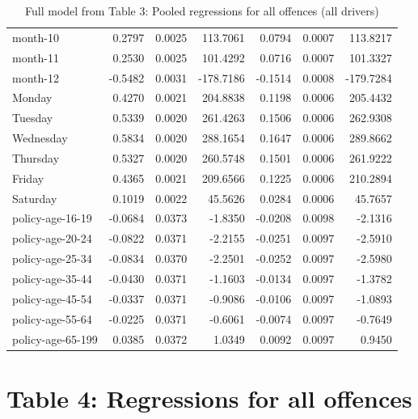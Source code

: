 \documentclass[10pt]{article}
\begin{document}
\begin{table}[ht]
\begin{tabular}{lrrrrrr}
  month-10 & 0.2797 & 0.0025 & 113.7061 & 0.0794 & 0.0007 & 113.8217 \\ 
  month-11 & 0.2530 & 0.0025 & 101.4292 & 0.0716 & 0.0007 & 101.3327 \\ 
  month-12 & -0.5482 & 0.0031 & -178.7186 & -0.1514 & 0.0008 & -179.7284 \\ 
  Monday & 0.4270 & 0.0021 & 204.8838 & 0.1198 & 0.0006 & 205.4432 \\ 
  Tuesday & 0.5339 & 0.0020 & 261.4263 & 0.1506 & 0.0006 & 262.9308 \\ 
  Wednesday & 0.5834 & 0.0020 & 288.1654 & 0.1647 & 0.0006 & 289.8662 \\ 
  Thursday & 0.5327 & 0.0020 & 260.5748 & 0.1501 & 0.0006 & 261.9222 \\ 
  Friday & 0.4365 & 0.0021 & 209.6566 & 0.1225 & 0.0006 & 210.2894 \\ 
  Saturday & 0.1019 & 0.0022 & 45.5626 & 0.0284 & 0.0006 & 45.7657 \\ 
  policy-age-16-19 & -0.0684 & 0.0373 & -1.8350 & -0.0208 & 0.0098 & -2.1316 \\ 
  policy-age-20-24 & -0.0822 & 0.0371 & -2.2155 & -0.0251 & 0.0097 & -2.5910 \\ 
  policy-age-25-34 & -0.0834 & 0.0370 & -2.2501 & -0.0252 & 0.0097 & -2.5980 \\ 
  policy-age-35-44 & -0.0430 & 0.0371 & -1.1603 & -0.0134 & 0.0097 & -1.3782 \\ 
  policy-age-45-54 & -0.0337 & 0.0371 & -0.9086 & -0.0106 & 0.0097 & -1.0893 \\ 
  policy-age-55-64 & -0.0225 & 0.0371 & -0.6061 & -0.0074 & 0.0097 & -0.7649 \\ 
  policy-age-65-199 & 0.0385 & 0.0372 & 1.0349 & 0.0092 & 0.0097 & 0.9450 \\ 
   \hline
\end{tabular}
\caption{Full model from Table 3: Pooled regressions for all offences (all drivers)} 
\label{tab_3_all_pts_with_age_A}
\end{table}


\clearpage
\pagebreak




\section{Table 4: Regressions for all offences}
\end{document}
